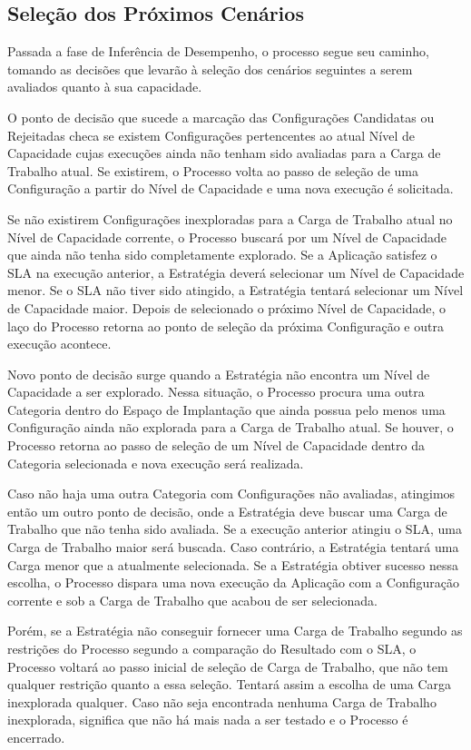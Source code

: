 \subsection{Seleção dos Próximos Cenários}
\label{subsec:selecao_cenarios}
Passada a fase de Inferência de Desempenho, o processo segue seu caminho, tomando
as decisões que levarão à seleção dos cenários seguintes a serem avaliados quanto
à sua capacidade.

O ponto de decisão que sucede a marcação das Configurações Candidatas ou Rejeitadas
checa se existem Configurações pertencentes ao atual Nível de Capacidade cujas 
execuções ainda não tenham sido avaliadas para a Carga de Trabalho atual. Se 
existirem, o Processo volta ao passo de seleção de uma Configuração a partir do 
Nível de Capacidade e uma nova execução é solicitada.

Se não existirem Configurações inexploradas para a Carga de Trabalho atual no
Nível de Capacidade corrente, o Processo buscará por um Nível de Capacidade que 
ainda não tenha sido completamente explorado. Se a Aplicação satisfez o SLA na 
execução anterior, a Estratégia deverá selecionar um Nível de Capacidade menor. 
Se o SLA não tiver sido atingido, a Estratégia tentará selecionar um  Nível de 
Capacidade maior. Depois de selecionado o próximo Nível de Capacidade, o laço do
Processo retorna ao ponto de seleção da próxima Configuração e outra execução 
acontece.
   
Novo ponto de decisão surge quando a Estratégia não encontra um Nível de 
Capacidade a ser explorado. Nessa situação, o Processo procura uma outra
Categoria dentro do Espaço de Implantação que ainda possua pelo menos uma
Configuração ainda não explorada para a Carga de Trabalho atual. Se houver,
o Processo retorna ao passo de seleção de um Nível de Capacidade dentro da
Categoria selecionada e nova execução será realizada.

Caso não haja uma outra Categoria com Configurações não avaliadas, atingimos
então um outro ponto de decisão, onde a Estratégia deve buscar uma Carga 
de Trabalho que não tenha sido avaliada. Se a execução anterior atingiu o SLA,
uma Carga de Trabalho maior será buscada. Caso contrário, a Estratégia tentará
uma Carga menor que a atualmente selecionada. Se a Estratégia obtiver sucesso
nessa escolha, o Processo dispara uma nova execução da Aplicação com a Configuração
corrente e sob a Carga de Trabalho que acabou de ser selecionada.

Porém, se a Estratégia não conseguir fornecer uma Carga de Trabalho segundo as 
restrições do Processo segundo a comparação do Resultado com o SLA, o Processo 
voltará ao passo inicial de seleção de Carga de Trabalho, que não tem qualquer 
restrição quanto a essa seleção. Tentará assim a escolha de uma Carga inexplorada
qualquer. Caso não seja encontrada nenhuma Carga de Trabalho inexplorada, significa
que não há mais nada a ser testado e o Processo é encerrado.

